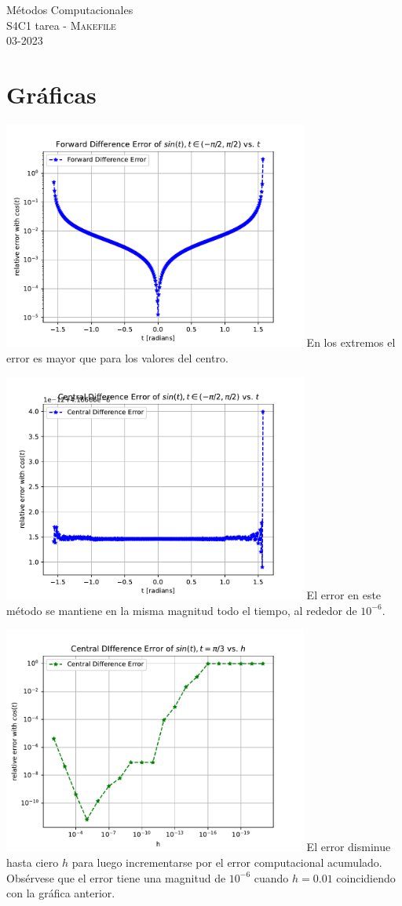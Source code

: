 \documentclass[11pt,letterpaper]{exam}
\begin{document}
\begin{center}
{\Large Métodos Computacionales} \\
S4C1 tarea - \textsc{Makefile}\\
03-2023\\
\end{center}


\noindent
\section{Gr\'aficas}
\begin{center}
\includegraphics[width=10cm]{err_derF.pdf}
En los extremos el error es mayor que para los valores del centro.
\begin{center}
\end{center}
\includegraphics[width=10cm]{err_derC.pdf}
El error en este método se mantiene en la misma magnitud todo el tiempo, al rededor de $10^{-6}$.  
\end{center}
\begin{center}
\includegraphics[width=10cm]{err_der_h.pdf}
El error disminue hasta ciero $h$ para luego incrementarse por el error computacional acumulado. 
Obsérvese que el error tiene una magnitud de $10^{-6}$ cuando $h=0.01$ coincidiendo con la gráfica anterior.
\end{center}
\end{document}
